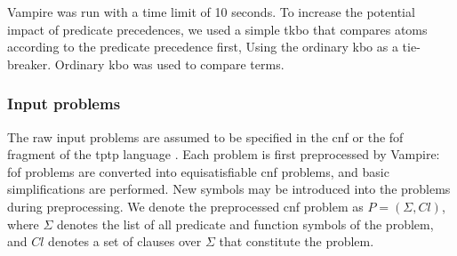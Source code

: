 
Vampire was run with a time limit of 10 seconds.
To increase the potential impact of predicate precedences,
we used a simple \gls{tkbo} \cite{Ludwig2007,Kovacs2011}
that compares atoms according to the predicate precedence first,
Using the ordinary \gls{kbo} as a tie-breaker.
Ordinary \gls{kbo} was used to compare terms.




\subsubsection{Input problems}

The raw input problems are assumed to be specified in the \gls{cnf} or the \gls{fof} fragment
of the \acrshort{tptp} language \cite{Sutcliffe2017}.
Each problem is first preprocessed by Vampire:
\gls{fof} problems are converted into equisatisfiable \gls{cnf} problems,
and basic simplifications are performed.
New symbols may be introduced into the problems during preprocessing.
We denote the preprocessed \gls{cnf} problem as $P = (\Sigma, \mathit{Cl})$,
where $\Sigma$ denotes the list of all predicate and function symbols of the problem,
and $\mathit{Cl}$ denotes a set of clauses over $\Sigma$ that constitute the problem.

